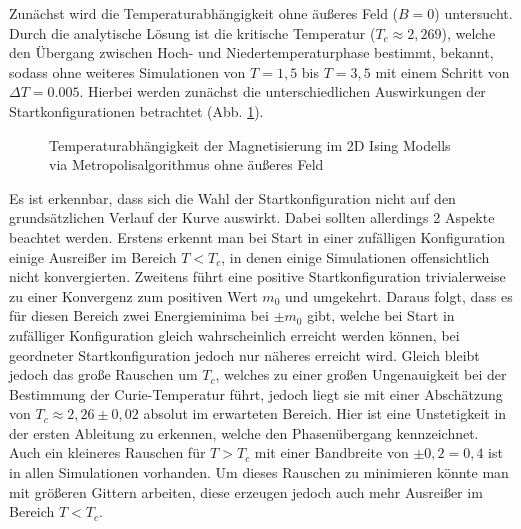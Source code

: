 Zunächst wird die Temperaturabhängigkeit ohne äußeres Feld ($B=0$) untersucht. Durch die analytische Lösung ist die kritische Temperatur ($T_{c}\approx 2,269$), welche den Übergang zwischen Hoch- und Niedertemperaturphase bestimmt, bekannt, sodass ohne weiteres Simulationen von $T=1,5$ bis $T=3,5$ mit einem Schritt von $\Delta T = 0.005$. Hierbei werden zunächst die unterschiedlichen Auswirkungen der Startkonfigurationen betrachtet (Abb. \ref{mp2d0modes}).
\begin{figure}[H]
	\centering
	\caption{Temperaturabhängigkeit der Magnetisierung im 2D Ising Modells via Metropolisalgorithmus ohne äußeres Feld}
	\label{mp2d0modes}
\end{figure}
Es ist erkennbar, dass sich die Wahl der Startkonfiguration nicht auf den grundsätzlichen Verlauf der Kurve auswirkt. Dabei sollten allerdings 2 Aspekte beachtet werden. Erstens erkennt man bei Start in einer zufälligen Konfiguration einige Ausreißer im Bereich $T<T_{c}$, in denen einige Simulationen offensichtlich nicht konvergierten. Zweitens führt eine positive Startkonfiguration trivialerweise zu einer Konvergenz zum positiven Wert $m_{0}$ und umgekehrt. Daraus folgt, dass es für diesen Bereich zwei Energieminima bei $\pm m_{0}$ gibt, welche bei Start in zufälliger Konfiguration gleich wahrscheinlich erreicht werden können, bei geordneter Startkonfiguration jedoch nur näheres erreicht wird. Gleich bleibt jedoch das große Rauschen um $T_{c}$, welches zu einer großen Ungenauigkeit bei der Bestimmung der Curie-Temperatur führt, jedoch liegt sie mit einer Abschätzung von $T_{c}\approx 2,26\pm 0,02$ absolut im erwarteten Bereich. Hier ist eine Unstetigkeit in der ersten Ableitung zu erkennen, welche den Phasenübergang kennzeichnet. Auch ein kleineres Rauschen für $T>T_{c}$ mit einer Bandbreite von $\pm 0,2 = 0,4$ ist in allen Simulationen vorhanden. Um dieses Rauschen zu minimieren könnte man mit größeren Gittern arbeiten, diese erzeugen jedoch auch mehr Ausreißer im Bereich $T<T_{c}$.


